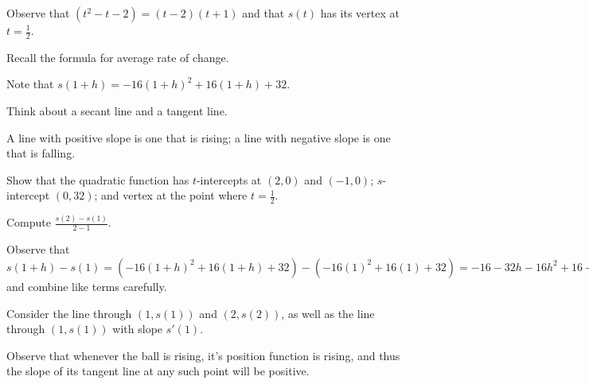 \begin{smallhint}
\ba
	\item Observe that $(t^2 - t - 2) = (t-2)(t+1)$ and that $s(t)$ has its vertex at $t = \frac{1}{2}$.
	\item Recall the formula for average rate of change.
	\item Note that $s(1+h) = -16(1+h)^2 + 16(1+h) + 32$.
	\item Think about a secant line and a tangent line.
	\item A line with positive slope is one that is rising; a line with negative slope is one that is falling.
\ea
\end{smallhint}
\begin{bighint}
\ba
	\item Show that the quadratic function has $t$-intercepts at $(2,0)$ and $(-1,0)$; $s$-intercept $(0,32)$; and vertex at the point where $t = \frac{1}{2}$.
	\item Compute $\frac{s(2)-s(1)}{2-1}$.
	\item Observe that $s(1+h) - s(1) = (-16(1+h)^2 + 16(1+h) + 32) - (-16(1)^2 + 16(1) + 32) = -16 - 32h - 16h^2 + 16 + 16h + 32 - 32$ and combine like terms carefully.
	\item Consider the line through $(1,s(1))$ and $(2,s(2))$, as well as the line through $(1,s(1))$ with slope $s'(1)$.
	\item Observe that whenever the ball is rising, it's position function is rising, and thus the slope of its tangent line at any such point will be positive.
\ea
\end{bighint}
